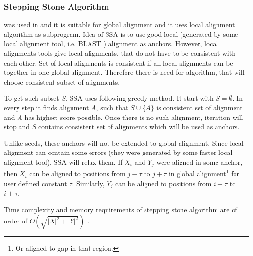 
\subsubsection{Stepping Stone Algorithm}

 was used in
\cite{Meyer2002,Pairagon2009} and it is
suitable for global alignment and it uses local alignment algorithm as
subprogram. Idea of SSA is to use good local (generated by some local alignment
tool, i.e. BLAST \cite{}) alignment as anchors. However, local alignments tools 
give local alignments, that do not have to be consistent with each other. Set of 
local alignments is consistent if all local alignments can be together in one global
alignment. Therefore there is need for algorithm, that will choose consistent
subset of alignments.

To get such subset $S$, SSA uses following greedy method. It start with
$S=\emptyset$. In every step it finds alignment $A$, such that $S\cup\{A\}$ is
consistent set of alignment and $A$ has highest score possible. Once there is no
such alignment, iteration will stop and $S$ contains consistent set of
alignments which will be used as anchors.

Unlike seeds, these anchors will not be extended to global alignment. Since
local alignment can contain some errors (they were generated by some faster
local alignment tool), SSA will relax them. If $X_i$ and $Y_j$ were aligned in
some anchor, then $X_i$ can be aligned to positions from $j-\tau$ to $j+\tau$ in
global alignment\footnote{Or aligned to gap in that region.} for user defined
constant $\tau$. Similarly, $Y_j$ can be aligned to positions from $i-\tau$ to
$i+\tau$.

Time complexity and memory requirements of stepping stone algorithm are of order
of $O(\sqrt{|X|^2+|Y|^2})$ \cite{Meyer2002}.







